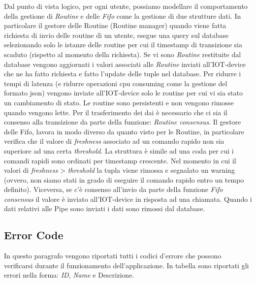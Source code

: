 \documentclass[onecolumn,a4paper]{article}
\begin{document}
Dal punto di vista logico, per ogni utente, possiamo modellare il comportamento della gestione di \emph{Routine} e delle \emph{Fifo} come la gestione di due strutture dati. In particolare il gestore delle Routine (Routine manager) quando viene fatta richiesta di invio delle routine di un utente, esegue una query sul database selezionando solo le istanze delle routine per cui il timestamp di transizione sia scaduto (rispetto al momento della richiesta). Se vi sono \emph{Routine} restituite dal database vengono aggiornati i valori associati alle \emph{Routine} inviati all'IOT-device che ne ha fatto richiesta e fatto l'update delle tuple nel database. Per ridurre i tempi di latenza (e ridurre operazioni cpu consuming come la gestione del formato json) vengono inviate all'IOT-device solo le routine per cui vi sia stato un cambiamento di stato. Le routine sono persistenti e non vengono rimosse quando vengono lette. Per il trasferimento dei dai è necessario che ci sia il consenso alla transizione da parte della funzione: \emph{Routine consensus}. Il gestore delle Fifo, lavora in modo diverso da quanto visto per le Routine, in particolare verifica che il valore di \emph{freshness} associato ad un comando rapido non sia superiore ad una certa \emph{threshold}. La struttura è simile ad una coda per cui i comandi rapidi sono ordinati per timestamp crescente. Nel momento in cui il valori di \emph{freshness} > \emph{threshold} la tupla viene rimossa e segnalato un warning (ovvero, non siamo stati in grado di eseguire il comando rapido entro un tempo definito). Viceversa, se c'è consenso all'invio da parte della funzione \emph{Fifo consensus} il valore è inviato all'IOT-device in risposta ad una chiamata. Quando i dati relativi alle Pipe sono inviati i dati sono rimossi dal database.

\subsection{Error Code}
\label{sec:org2c23ab1}
In questo paragrafo vengono riportati tutti i codici d'errore che possono verificarsi durante il funzionamento dell'applicazione. In tabella sono riportati gli errori nella forma: \emph{ID}, \emph{Name} e Descrizione.
\end{document}
